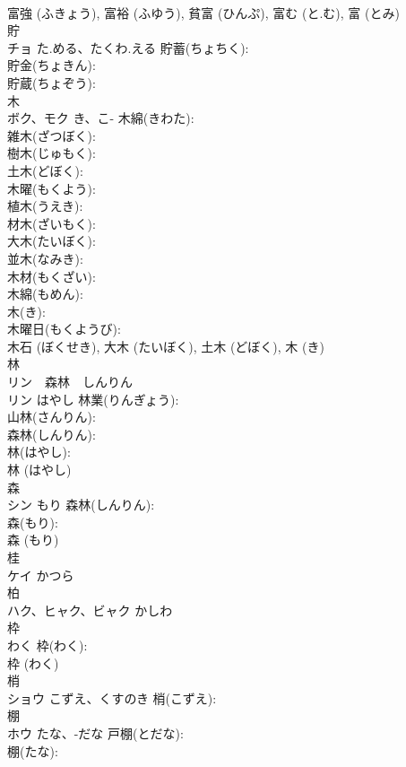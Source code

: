 \documentclass[8pt]{extreport}
\begin{document}
\begin{CJK}{UTF8}{min}
\\	富強 (ふきょう), 富裕 (ふゆう), 貧富 (ひんぷ), 富む (と.む), 富 (とみ)
\\	貯			
\\	チョ	た.める、たくわ.える	貯蓄(ちょちく): 
\\	貯金(ちょきん): 
\\	貯蔵(ちょぞう): 
\\	木			
\\	ボク、モク	き、こ-	木綿(きわた): 
\\	雑木(ざつぼく): 
\\	樹木(じゅもく): 
\\	土木(どぼく): 
\\	木曜(もくよう): 
\\	植木(うえき): 
\\	材木(ざいもく): 
\\	大木(たいぼく): 
\\	並木(なみき): 
\\	木材(もくざい): 
\\	木綿(もめん): 
\\	木(き): 
\\	木曜日(もくようび): 
\\	木石 (ぼくせき), 大木 (たいぼく), 土木 (どぼく), 木 (き)
\\	林			
\\	リン　森林　しんりん
\\	リン	はやし	林業(りんぎょう): 
\\	山林(さんりん): 
\\	森林(しんりん): 
\\	林(はやし): 
\\	林 (はやし)
\\	森			
\\	シン	もり	森林(しんりん): 
\\	森(もり): 
\\	森 (もり)
\\	桂			
\\	ケイ	かつら		
\\	柏			
\\	ハク、ヒャク、ビャク	かしわ		
\\	枠			
\\	わく	枠(わく): 
\\	枠 (わく)
\\	梢			
\\	ショウ	こずえ、くすのき	梢(こずえ): 
\\	棚			
\\	ホウ	たな、-だな	戸棚(とだな): 
\\	棚(たな): 

\end{CJK}
\end{document}
